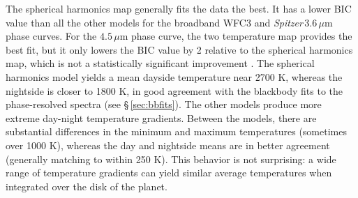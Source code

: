 \documentclass[twocolumn, trackchanges]{aastex61}
\newcommand{\project}[1]{\textsl{#1}}
\newcommand{\Spitzer}{\project{Spitzer}}
\begin{document}
The spherical harmonics map generally fits the data the best. It has a lower BIC value than all the other models for the broadband WFC3 and \Spitzer\,$3.6\,\mu$m phase curves. For the $4.5\,\mu$m phase curve, the two temperature map provides the best fit, but it only lowers the BIC value by 2 relative to the spherical harmonics map, which is not a statistically significant improvement \citep{kass95}.  The spherical harmonics model yields a mean dayside temperature near 2700 K, whereas the nightside is closer to 1800 K, in good agreement with the blackbody fits to the phase-resolved spectra (see \S\,\ref{sec:bbfits}).  The other models produce more extreme day-night temperature gradients.  Between the models, there are substantial differences in the minimum and maximum temperatures (sometimes over 1000 K), whereas the day and nightside means are in better agreement (generally matching to within 250 K). This behavior is not surprising: a wide range of temperature gradients can yield similar average temperatures when integrated over the disk of the planet.  


\end{document}
